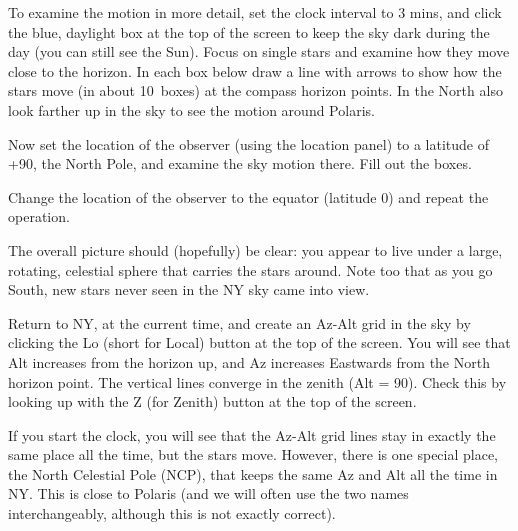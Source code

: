\documentclass[12pt]{article}
\begin{document}
To examine the motion in more detail, set the clock interval to 3
mins, and click the blue, daylight box at the top of the screen to
keep the sky dark during the day (you can still see the Sun). 
Focus on single stars and examine how they move close to the
horizon. In each box below draw a line with arrows to show how the
stars move (in about 10\deg\ boxes) at the compass horizon points. In the North also look
farther up in the sky to see the motion around Polaris.


        \begin{figure*}[h]
        \centerline{}
         \end{figure*}


\noindent
Now set the location of the observer (using the location panel) to a
latitude of +90\deg, the North Pole, and examine the sky motion
there. Fill out the boxes.



        \begin{figure*}[h]
        \centerline{}
         \end{figure*}

\noindent
Change the location of the observer to the equator (latitude 0\deg)
and repeat the operation.


        \begin{figure*}[h]
        \centerline{}
         \end{figure*}



The overall picture should (hopefully) be clear: you appear to live
under a large, rotating, celestial sphere that carries the stars
around. Note too that as you go South, new stars never seen in the NY
sky came into view.

 
\bigskip
\noindent

\newpage
{}

\medskip
\noindent
Return to NY, at the current time, and create an Az-Alt grid in the sky
by clicking the Lo (short for Local) button at the top of the screen. You will see that
Alt increases from the horizon up, and Az increases Eastwards from the
North horizon point. The vertical lines converge in the zenith (Alt =
90\deg). Check this by looking up with the Z (for Zenith) button at the
top of the screen.

If you start the clock, you will see that the Az-Alt
grid lines stay in exactly the same place all the time, but the stars
move. However, there is one special place, the North Celestial Pole
(NCP), that keeps the same Az and Alt all the time in NY. This is
close to Polaris (and we will often use the two names interchangeably,
although this is not exactly correct).
\end{document}
